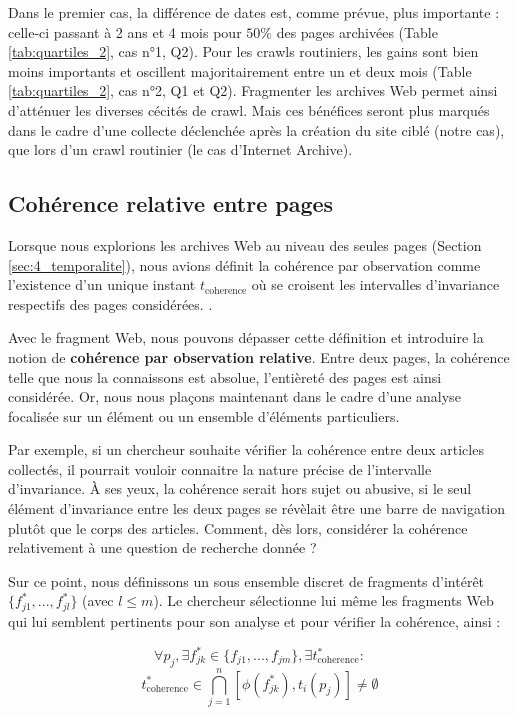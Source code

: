 \documentclass[symmetric,justified,marginals=raggedouter]{tufte-book}
\begin{document}
\noindent Dans le premier cas, la différence de dates est, comme prévue, plus importante : celle-ci passant à 2 ans et 4 mois pour $50\%$ des pages archivées (Table \ref{tab:quartiles_2}, cas n°1, Q2). Pour les crawls routiniers, les gains sont bien moins importants et oscillent majoritairement entre un et deux mois (Table \ref{tab:quartiles_2}, cas n°2, Q1 et Q2). Fragmenter les archives Web permet ainsi d'atténuer les diverses cécités de crawl. Mais ces bénéfices seront plus marqués dans le cadre d'une collecte déclenchée après la création du site ciblé (notre cas), que lors d'un crawl routinier (le cas d'Internet Archive).    

\subsection{Cohérence relative entre pages}

\noindent Lorsque nous explorions les archives Web au niveau des seules pages (Section \ref{sec:4_temporalite}), nous avions définit la cohérence par observation comme l'existence d'un unique instant $t_{\mathrm{coherence}}$ où se croisent les intervalles d'invariance respectifs des pages considérées. \citep{spaniol_data_2009}. 

Avec le fragment Web, nous pouvons dépasser cette définition et introduire la notion de \textbf{cohérence par observation relative}. Entre deux pages, la cohérence telle que nous la connaissons est absolue, l'entièreté des pages est ainsi considérée. Or, nous nous plaçons maintenant dans le cadre d'une analyse focalisée sur un élément ou un ensemble d'éléments particuliers.

Par exemple, si un chercheur souhaite vérifier la cohérence entre deux articles collectés, il pourrait vouloir connaitre la nature précise de l'in\-tervalle d'invariance. À ses yeux, la cohérence serait hors sujet ou abusive, si le seul élément d'invariance entre les deux pages se révèlait être une barre de navigation plutôt que le corps des articles. Comment, dès lors, considérer la cohérence relativement à une question de recherche donnée ? 

Sur ce point, nous définissons un sous ensemble discret de fragments d'intérêt $\{f^*_{j1},...,f^*_{jl}\}$ (avec $l \leq m$). Le chercheur sélectionne lui même les fragments Web qui lui semblent pertinents pour son analyse et pour vérifier la cohérence, ainsi :

\newpage

\[
	\forall p_j, \exists f^*_{jk} \in \{f_{j1},...,f_{jm}\}, \exists t^*_{\mathrm{coherence}}:
\] 
\[
	t^*_{\mathrm{coherence}} \in \bigcap^n_{j=1}[\phi(f^*_{jk}),t_i(p_j)] \neq \emptyset
\] 
\end{document}
